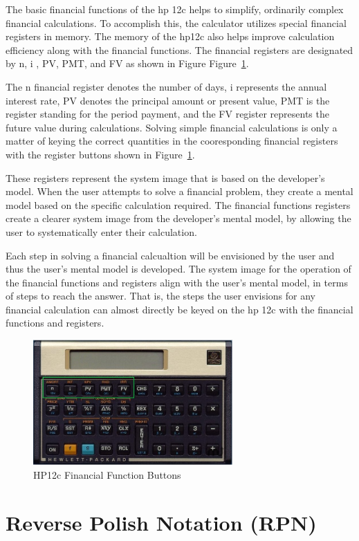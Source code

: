 \documentclass{article}
\begin{document}
The basic financial functions of the hp 12c helps to simplify, ordinarily complex financial calculations. To accomplish this, the calculator utilizes special financial registers in memory. The memory of the hp12c also helps improve calculation efficiency along with the financial functions. The financial registers are designated by n, i , PV, PMT, and FV as shown in Figure Figure~\ref{financial-buttons}.

The n financial register denotes the number of days, i represents the annual interest rate, PV denotes the principal amount or present value, PMT is the register standing for the period payment, and the FV register represents the future value during calculations. Solving simple financial calculations is only a matter of keying the correct quantities in the cooresponding financial registers with the register buttons shown in Figure~\ref{financial-buttons}.

These registers represent the system image that is based on the developer's model. When the user attempts to solve a financial problem, they create a mental model based on the specific calculation required. The financial functions registers create a clearer system image from the developer's mental model, by allowing the user to systematically enter their calculation. 

Each step in solving a financial calcualtion will be envisioned by the user and thus the user's mental model is developed. The system image for the operation of the financial functions and registers align with the user's mental model, in terms of steps to reach the answer. That is, the steps the user envisions for any financial calculation can almost directly be keyed on the hp 12c with the financial functions and registers.

\begin{figure}
\centering
\includegraphics[width=3in]{Figure_1.jpg}
\caption{HP12c Financial Function Buttons}
\label{financial-buttons}
\end{figure}

\section{Reverse Polish Notation (RPN)}
\end{document}
